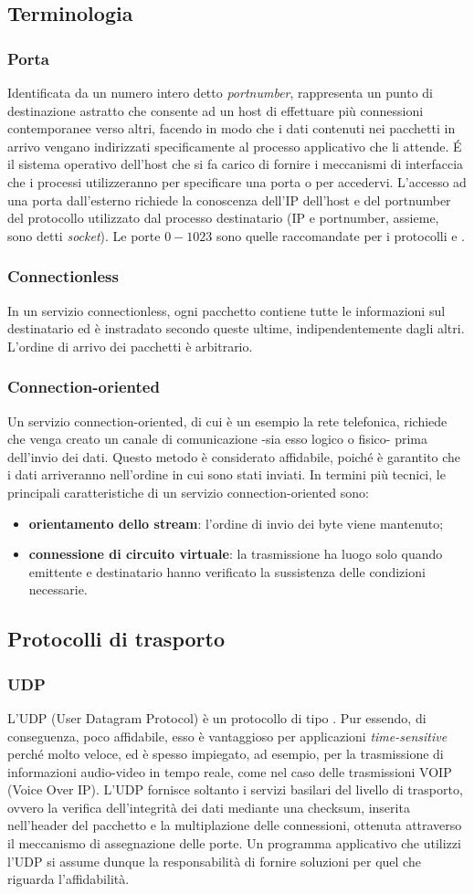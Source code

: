 \documentclass[a4paper, twoside]{article}
\def\sub#1{\subsection{#1}\label{#1}}
\def\subsub#1{\subsubsection{#1}\label{#1}}
\def\vedi#1{\nameref{#1}}
\begin{document}
\subsection{Terminologia}
\subsub{Porta} 
Identificata da un numero intero detto \textit{portnumber}, rappresenta un punto di destinazione astratto che consente ad un host di effettuare più connessioni contemporanee verso altri, facendo in modo che i dati contenuti nei pacchetti in arrivo vengano indirizzati specificamente al processo applicativo che li attende. \'E il sistema operativo dell'host che si fa carico di fornire i meccanismi di interfaccia che i processi utilizzeranno per specificare una porta o per accedervi. L'accesso ad una porta dall'esterno richiede la conoscenza dell'IP dell'host e del portnumber del protocollo utilizzato dal processo destinatario (IP e portnumber, assieme, sono detti \textit{socket}). Le porte $0-1023$ sono quelle raccomandate per i protocolli \vedi{TCP} e \vedi{UDP}.
\subsub{Connectionless}
In un servizio connectionless, ogni pacchetto contiene tutte le informazioni sul destinatario ed è instradato secondo queste ultime, indipendentemente dagli altri. L'ordine di arrivo dei pacchetti è arbitrario.
\subsub{Connection-oriented} 
Un servizio connection-oriented, di cui è un esempio la rete telefonica, richiede che venga creato un canale di comunicazione -sia esso logico o fisico- prima dell'invio dei dati. Questo metodo è considerato affidabile, poiché è garantito che i dati arriveranno nell'ordine in cui sono stati inviati. In termini più tecnici, le principali caratteristiche di un servizio connection-oriented sono:
\begin{itemize}
\item \textbf{orientamento dello stream}: l'ordine di invio dei byte viene mantenuto;
\item \textbf{connessione di circuito virtuale}: la trasmissione ha luogo solo quando emittente e destinatario hanno verificato la sussistenza delle condizioni necessarie.
\end{itemize}

\sub{Protocolli di trasporto} 
\subsub{UDP} 
L'UDP (User Datagram Protocol) è un protocollo di tipo \vedi{Connectionless}. Pur essendo, di conseguenza, poco affidabile, esso è vantaggioso per applicazioni \textit{time-sensitive} perché molto veloce, ed è spesso impiegato, ad esempio, per la trasmissione di informazioni audio-video in tempo reale, come nel caso delle trasmissioni VOIP (Voice Over IP). L'UDP fornisce soltanto i servizi basilari del livello di trasporto, ovvero la verifica dell'integrità dei dati mediante una checksum, inserita nell'header del pacchetto e la multiplazione delle connessioni, ottenuta attraverso il meccanismo di assegnazione delle porte. Un programma applicativo che utilizzi l'UDP si assume dunque la responsabilità di fornire soluzioni per quel che riguarda l'affidabilità.
\end{document}
